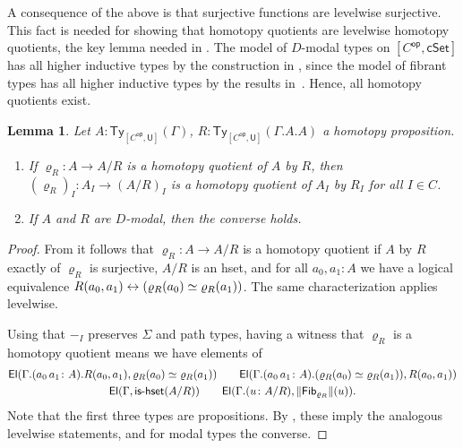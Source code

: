 \documentclass[10pt,a4paper]{article}
\newtheorem{lemma}{Lemma}[section]
\newcommand{\U}{\mathsf{U}}
\newcommand{\cSet}{\mathsf{cSet}}
\DeclareMathOperator\op{\mathsf{op}}
\newcommand\Ty{\mathsf{Ty}}
\newcommand\El{\mathsf{El}}
\DeclarePairedDelimiter\paren{(}{)}
\newcommand\Fib{\mathsf{Fib}}
\begin{document}
A consequence of the above is that surjective functions are levelwise surjective.
This fact is needed for showing that homotopy quotients are levelwise homotopy quotients, the key lemma needed in .
The model of \(D\)-modal types on \([C^{\op}, \cSet]\) has all higher inductive types by the construction in \cite{CRS21}, since the model of fibrant types has all higher inductive types by the results in~\cite{CoquandHM18}.
Hence, all homotopy quotients exist.

\begin{lemma}\label{prop:psh:levelwise-quotient-if-homotopy-quotient}
  Let \(A \colon \Ty_{[C^{\op}, \U]}(\Gamma)\), \(R \colon \Ty_{[C^{\op}, \U]}(\Gamma.A.A)\) a homotopy proposition.
  \begin{enumerate}[label=(\arabic*)]
    \item If \(\varrho_R \colon A \to A/R\) is a homotopy quotient of \(A\) by \(R\), then \((\varrho_R)_I \colon A_I \to (A/R)_I\) is a homotopy quotient of \(A_I\) by \(R_I\) for all \(I \in C\).
    \item If \(A\) and \(R\) are \(D\)-modal, then the converse holds.
  \end{enumerate}
\end{lemma}
\begin{proof}
  From \cite[Theorem 18.2.3]{rijke2025intro} it follows that \(\varrho_R \colon A \to A/R\) is a homotopy quotient if \(A\) by \(R\) exactly of \(\varrho_R\) is surjective, \(A/R\) is an hset, and for all \(a_0, a_1 \colon A\) we have a logical equivalence \(R(a_0, a_1) \leftrightarrow \paren{\varrho_R(a_0) \simeq \varrho_R(a_1)}\).
  The same characterization applies levelwise.

  Using that \(-_I\) preserves \(\Sigma\) and path types, having a witness that \(\varrho_R\) is a homotopy quotient means we have elements of
  \begin{gather*}  
    \El(\Gamma.(a_0\,a_1 \colon A).R(a_0, a_1), \varrho_R(a_0) \simeq \varrho_R(a_1))
    \qquad \El(\Gamma.(a_0\,a_1 \colon A).(\varrho_R(a_0) \simeq \varrho_R(a_1)), R(a_0, a_1)) \\
    \El(\Gamma, \textsf{is-hset}(A/R))
    \qquad
    \El(\Gamma.(u \colon A/R), \trunc{\Fib_{\varrho_R}}(u)).
  \end{gather*}
  Note that the first three types are propositions.
  By , these imply the analogous levelwise statements, and for modal types the converse.
\end{proof}
\end{document}
